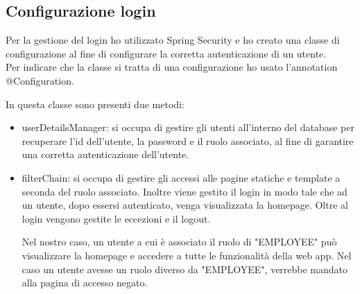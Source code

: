 \subsection{Configurazione login}
Per la gestione del login ho utilizzato Spring Security e ho creato una classe di configurazione al fine di configurare la corretta autenticazione di un utente.\\
Per indicare che la classe si tratta di una configurazione ho usato l'annotation @Configuration.

In questa classe sono presenti due metodi:
\begin{itemize}
    \item userDetailsManager: si occupa di gestire gli utenti all'interno del database per recuperare l'id dell'utente, la password e il ruolo associato, al fine di garantire una corretta autenticazione dell'utente.
    \item filterChain: si occupa di gestire gli accessi alle pagine statiche e template a seconda del ruolo associato. Inoltre viene gestito il login in modo tale che ad un utente, dopo essersi autenticato, venga visualizzata la homepage. Oltre al login vengono gestite le eccezioni e il logout.
    
    Nel nostro caso, un utente a cui è associato il ruolo di "EMPLOYEE" può visualizzare la homepage e accedere a tutte le funzionalità della web app. Nel caso un utente avesse un ruolo diverso da "EMPLOYEE", verrebbe mandato alla pagina di accesso negato.
\end{itemize}
